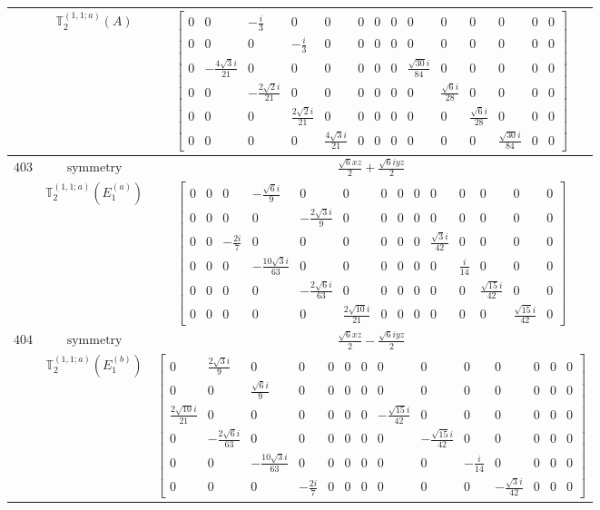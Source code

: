\documentclass[fleqn,8pt,landscape]{jsarticle}
\begin{document}
\begin{longtable}{ccc}
$  $ & $ \mathbb{T}_{2}^{(1,1;a)}(A) $ & $ \begin{bmatrix} 0 & 0 & - \frac{i}{3} & 0 & 0 & 0 & 0 & 0 & 0 & 0 & 0 & 0 & 0 & 0 \\ 0 & 0 & 0 & - \frac{i}{3} & 0 & 0 & 0 & 0 & 0 & 0 & 0 & 0 & 0 & 0 \\ 0 & - \frac{4 \sqrt{3} i}{21} & 0 & 0 & 0 & 0 & 0 & 0 & \frac{\sqrt{30} i}{84} & 0 & 0 & 0 & 0 & 0 \\ 0 & 0 & - \frac{2 \sqrt{2} i}{21} & 0 & 0 & 0 & 0 & 0 & 0 & \frac{\sqrt{6} i}{28} & 0 & 0 & 0 & 0 \\ 0 & 0 & 0 & \frac{2 \sqrt{2} i}{21} & 0 & 0 & 0 & 0 & 0 & 0 & \frac{\sqrt{6} i}{28} & 0 & 0 & 0 \\ 0 & 0 & 0 & 0 & \frac{4 \sqrt{3} i}{21} & 0 & 0 & 0 & 0 & 0 & 0 & \frac{\sqrt{30} i}{84} & 0 & 0 \end{bmatrix} $ \\ \hline
$ 403 $ & $ \text{symmetry} $ & $ \frac{\sqrt{6} x z}{2} + \frac{\sqrt{6} i y z}{2} $ \\
$  $ & $ \mathbb{T}_{2}^{(1,1;a)}(E_{1}^{(a)}) $ & $ \begin{bmatrix} 0 & 0 & 0 & - \frac{\sqrt{6} i}{9} & 0 & 0 & 0 & 0 & 0 & 0 & 0 & 0 & 0 & 0 \\ 0 & 0 & 0 & 0 & - \frac{2 \sqrt{3} i}{9} & 0 & 0 & 0 & 0 & 0 & 0 & 0 & 0 & 0 \\ 0 & 0 & - \frac{2 i}{7} & 0 & 0 & 0 & 0 & 0 & 0 & \frac{\sqrt{3} i}{42} & 0 & 0 & 0 & 0 \\ 0 & 0 & 0 & - \frac{10 \sqrt{3} i}{63} & 0 & 0 & 0 & 0 & 0 & 0 & \frac{i}{14} & 0 & 0 & 0 \\ 0 & 0 & 0 & 0 & - \frac{2 \sqrt{6} i}{63} & 0 & 0 & 0 & 0 & 0 & 0 & \frac{\sqrt{15} i}{42} & 0 & 0 \\ 0 & 0 & 0 & 0 & 0 & \frac{2 \sqrt{10} i}{21} & 0 & 0 & 0 & 0 & 0 & 0 & \frac{\sqrt{15} i}{42} & 0 \end{bmatrix} $ \\ \hline
$ 404 $ & $ \text{symmetry} $ & $ \frac{\sqrt{6} x z}{2} - \frac{\sqrt{6} i y z}{2} $ \\
$  $ & $ \mathbb{T}_{2}^{(1,1;a)}(E_{1}^{(b)}) $ & $ \begin{bmatrix} 0 & \frac{2 \sqrt{3} i}{9} & 0 & 0 & 0 & 0 & 0 & 0 & 0 & 0 & 0 & 0 & 0 & 0 \\ 0 & 0 & \frac{\sqrt{6} i}{9} & 0 & 0 & 0 & 0 & 0 & 0 & 0 & 0 & 0 & 0 & 0 \\ \frac{2 \sqrt{10} i}{21} & 0 & 0 & 0 & 0 & 0 & 0 & - \frac{\sqrt{15} i}{42} & 0 & 0 & 0 & 0 & 0 & 0 \\ 0 & - \frac{2 \sqrt{6} i}{63} & 0 & 0 & 0 & 0 & 0 & 0 & - \frac{\sqrt{15} i}{42} & 0 & 0 & 0 & 0 & 0 \\ 0 & 0 & - \frac{10 \sqrt{3} i}{63} & 0 & 0 & 0 & 0 & 0 & 0 & - \frac{i}{14} & 0 & 0 & 0 & 0 \\ 0 & 0 & 0 & - \frac{2 i}{7} & 0 & 0 & 0 & 0 & 0 & 0 & - \frac{\sqrt{3} i}{42} & 0 & 0 & 0 \end{bmatrix} $ \\ \hline

\end{longtable}
\end{document}
